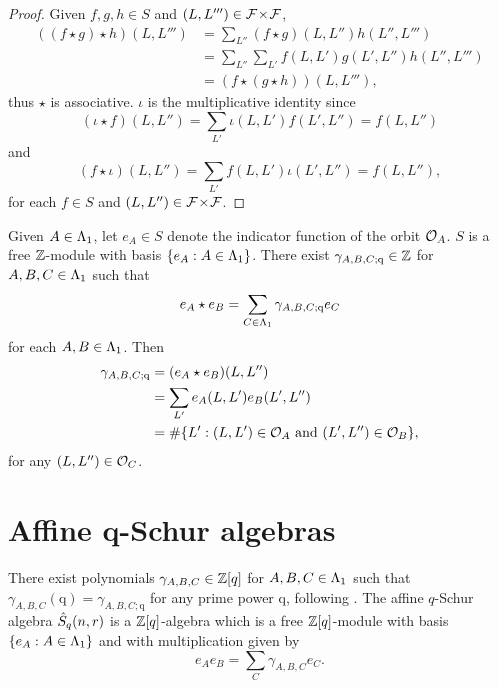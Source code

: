 \documentclass[a4paper, 11pt]{report}
\begin{document}
\begin{proof}
Given $f,g,h\in S$ and $(L,L''')\in{\mathcal{F}\!\times\!\mathcal{F}}$,
\begin{align*}
((f\star g)\star h)(L,L''')
&= \sum_{L''} (f\star g)(L,L'')h(L'',L''')\\
&= \sum_{L''}\sum_{L'} f(L,L')g(L',L'')h(L'',L''')\\
&= (f\star (g\star h))(L,L'''),
\end{align*}
thus $\star$ is associative. $\iota$ is the multiplicative identity since
\begin{equation*}
(\iota\star f)(L,L'') = \sum_{L'}\iota(L,L')f(L',L'') = f(L,L'')
\end{equation*}
and
\begin{equation*}
(f\star\iota)(L,L'') = \sum_{L'}f(L,L')\iota(L',L'') = f(L,L''),
\end{equation*}
for each $f\in S$ and $(L,L'')\in{\mathcal{F}\!\times\!\mathcal{F}}$.
\end{proof}

Given $A\in\Lambda_1{}$, let $e_A\in S$ denote the indicator function of the orbit $\mathcal{O}_{A}$. $S$ is a free $\mathbb{Z}$-module with basis $\{e_A:A\in\Lambda_1{}\}$. There exist $\gamma_{A,B,C;\mathrm{q}}\in\mathbb{Z}$ for $A,B,C\in\Lambda_1{}$ such that
\begin{equation*}
e_A\star e_B = \sum_{C\in\Lambda_1{}} \gamma_{A,B,C;\mathrm{q}}e_C
\end{equation*}
for each $A,B\in\Lambda_1{}$. Then
\begin{align*}
\gamma_{A,B,C;\mathrm{q}}
&=(e_A\star e_B)(L,L'')\\
&= \sum_{L'} e_A(L,L')e_B(L',L'')\\
&= \#\{L':(L,L')\in\mathcal{O}_{A} \text{ and }(L',L'')\in\mathcal{O}_{B}\},
\end{align*}
for any $(L,L'')\in\mathcal{O}_{C}$.

\section{Affine q-Schur algebras}

There exist polynomials $\gamma_{A,B,C}\in\mathbb{Z}[q]$ for $A,B,C\in\Lambda_1{}$ such that $\gamma_{A,B,C}(\mathrm{q}) = \gamma_{A,B,C;\mathrm{q}}$ for any prime power $\mathrm{q}$, following \cite[section 4]{lusztig99}. The affine $q$-Schur algebra $\hat{S}_q(n,r)$ is a $\mathbb{Z}[q]$-algebra which is a free $\mathbb{Z}[q]$-module with basis $\{e_A:A\in\Lambda_1{}\}$ and with multiplication given by
\begin{equation*}
e_A e_B = \sum_{C} \gamma_{A,B,C}e_C.
\end{equation*}
\end{document}
